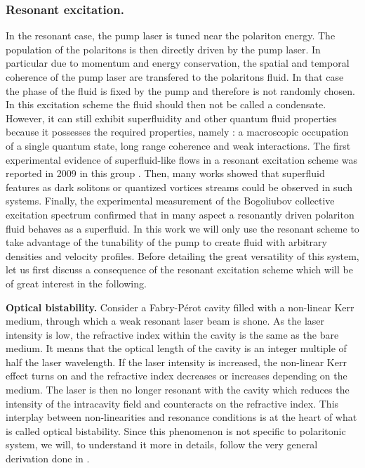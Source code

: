 \subsubsection{Resonant excitation.} In the resonant case, the pump laser is tuned near the polariton energy. The population of the polaritons is then directly driven by the pump laser. In particular due to momentum and energy conservation, the spatial and temporal coherence of the pump laser are transfered to the polaritons fluid. 
In that case the phase of the fluid is fixed by the pump and therefore is not randomly chosen. In this excitation scheme the fluid should then not be called a condensate. However, it can still exhibit superfluidity and other quantum fluid properties because it possesses the required properties, namely : a macroscopic occupation of a single quantum state, long range coherence and weak interactions.
The first experimental evidence of superfluid-like flows in a resonant excitation scheme was reported in 2009 in this group \cite{Amo_fluidlightexp_2009}. Then, many works showed that superfluid features as dark solitons \cite{maitre_thesis} or quantized vortices streams \cite{vortex_stream_2020} could be observed in such systems. Finally, the experimental measurement of the Bogoliubov collective excitation spectrum \cite{stepanov_dispersion_2019,claude_high-resolution_2022,claude_prb} confirmed that in many aspect a resonantly driven polariton fluid behaves as a superfluid. In this work we will only use the resonant scheme to take advantage of the tunability of the pump to create fluid with arbitrary densities and velocity profiles. 
Before detailing the great versatility of this system, let us  first discuss 
a consequence of the resonant excitation scheme which will be of great interest in the following.

\bigskip

\textbf{Optical bistability.} Consider a Fabry-Pérot cavity filled with a non-linear Kerr medium, through which a weak resonant laser beam is shone. As the laser intensity is low, the refractive index within the cavity is the same as the bare medium. It means that the optical length of the cavity is an integer multiple of half the laser wavelength.
If the laser intensity is increased, the non-linear Kerr effect turns on and the refractive index decreases or increases depending on the medium. The laser is then no longer resonant with the cavity which reduces the intensity of the intracavity field and counteracts on the refractive index. This interplay between 
non-linearities and resonance conditions is at the heart of what is called optical bistability. Since this phenomenon is not specific to polaritonic system, we will, to understand it more in details, follow the very general derivation done in \cite{grynberg_aspect_fabre}.
\label{subsec:optical_bistability}

